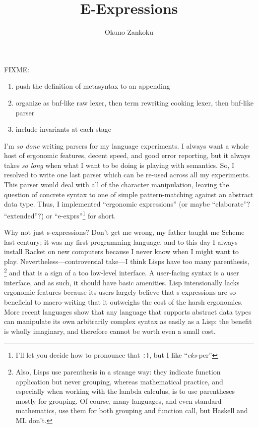 \documentclass[11pt]{article} %
\title{E-Expressions}
\author{Okuno Zankoku}
\begin{document}
FIXME:
\begin{enumerate}
  \item push the definition of metasyntax to an appending
  \item organize as bnf-like raw lexer, then term rewriting cooking lexer, then bnf-like parser
  \item include invariants at each stage
\end{enumerate}

\maketitle

I'm \emph{so done} writing parsers for my language experiments.
I always want a whole host of ergonomic features, decent speed, and good error reporting, but it always takes \emph{so long} when what I want to be doing is playing with semantics.
So, I resolved to write one last parser which can be re-used across all my experiments.
This parser would deal with all of the character manipulation, leaving the question of concrete syntax to one of simple pattern-matching against an abstract data type.
Thus, I implemented ``ergonomic expressions'' (or maybe ``elaborate''? ``extended''?) or ``e-exprs''\footnote{I'll let you decide how to pronounce that \texttt{:)}, but I like ``\emph{eks}-per''} for short.

{
  Why not just s-expressions?
  Don't get me wrong, my father taught me Scheme last century; it was my first programming language, and to this day I always install Racket on new computers because I never know when I might want to play.
  Nevertheless---controversial take---I think Lisps have too many parenthesis,%
    \footnote{Also, Lisps use parenthesis in a strange way: they indicate function application but never grouping, whereas mathematical practice, and especially when working with the lambda calculus, is to use parentheses mostly for grouping.
    Of course, many languages, and even standard mathematics, use them for both grouping and function call, but Haskell and ML don't.
    }
    and that is a sign of a too low-level interface.
  A user-facing syntax is a user interface, and as such, it should have basic amenities.
  Lisp intensionally lacks ergonomic features because its users largely believe that s-expressions are so beneficial to macro-writing that it outweighs the cost of the harsh ergonomics.
  More recent languages show that any language that supports abstract data types can manipulate its own arbitrarily complex syntax as easily as a Lisp: the benefit is wholly imaginary, and therefore cannot be worth even a small cost.
}
\end{document}
